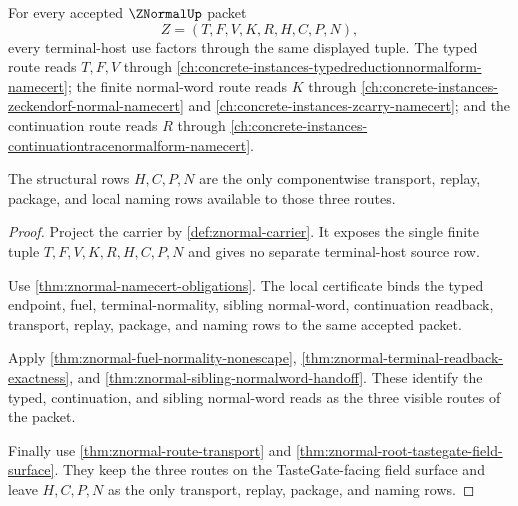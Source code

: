 \begin{theorem}
\label{thm:znormal-total-host-scope-triad}
For every accepted $\ZNormalUp$ packet
$$
Z=(T,F,V,K,R,H,C,P,N),
$$
every terminal-host use factors through the same displayed tuple. The typed route reads $T,F,V$ through \autoref{ch:concrete-instances-typedreductionnormalform-namecert}; the finite normal-word route reads $K$ through \autoref{ch:concrete-instances-zeckendorf-normal-namecert} and \autoref{ch:concrete-instances-zcarry-namecert}; and the continuation route reads $R$ through \autoref{ch:concrete-instances-continuationtracenormalform-namecert}.

The structural rows $H,C,P,N$ are the only componentwise transport, replay, package, and local naming rows available to those three routes.
\end{theorem}
\begin{proof}
Project the carrier by \autoref{def:znormal-carrier}. It exposes the single finite tuple $T,F,V,K,R,H,C,P,N$ and gives no separate terminal-host source row.

Use \autoref{thm:znormal-namecert-obligations}. The local certificate binds the typed endpoint, fuel, terminal-normality, sibling normal-word, continuation readback, transport, replay, package, and naming rows to the same accepted packet.

Apply \autoref{thm:znormal-fuel-normality-nonescape}, \autoref{thm:znormal-terminal-readback-exactness}, and \autoref{thm:znormal-sibling-normalword-handoff}. These identify the typed, continuation, and sibling normal-word reads as the three visible routes of the packet.

Finally use \autoref{thm:znormal-route-transport} and \autoref{thm:znormal-root-tastegate-field-surface}. They keep the three routes on the TasteGate-facing field surface and leave $H,C,P,N$ as the only transport, replay, package, and naming rows.
\end{proof}

